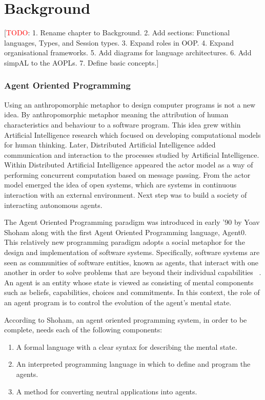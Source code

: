\documentclass[a4paper,12pt,oneside,fleqn]{book} %
\newcommand{\todo}[1]{[\textcolor{red}{TODO}: #1]}
\begin{document}

\part{Background}\label{ch:aop} %
\todo{1. Rename chapter to Background. 2. Add sections: Functional languages,
Types, and Session types. 3. Expand roles in OOP. 4. Expand organisational
frameworks. 5. Add diagrams for
language architectures. 6. Add simpAL to the AOPLs. 7. Define basic
concepts.}
\section{Agent Oriented Programming} %

Using an anthropomorphic metaphor to design computer programs is not a new
idea. By anthropomorphic metaphor meaning the attribution of human
characteristics and behaviour to a software program. This idea grew within
Artificial Intelligence research which focused on developing computational
models for human thinking. Later, Distributed Artificial Intelligence added
communication and interaction to the processes studied by Artificial
Intelligence.  Within Distributed Artificial Intelligence appeared the
actor model as a way of performing concurrent computation based on message
passing. From the actor model emerged the idea of open systems, which are
systems in continuous interaction with an external environment. Next step
was to build a society of interacting autonomous agents.

The Agent Oriented Programming paradigm was introduced in early '90 by Yoav
Shoham along with the first Agent Oriented Programming language, Agent0.
This relatively new programming paradigm adopts a social metaphor for the
design and implementation of software systems. Specifically, software
systems are seen as communities of software entities, known as agents, that
interact with one another in order to solve problems that are beyond their
individual capabilities ~\cite{DBLP:journals/ai/Shoham93}. An agent
is an entity whose state is viewed as consisting of mental components such
as beliefs, capabilities, choices and commitments. In this context, the role
of an agent program is to control the evolution of the agent's mental
state.

According to Shoham, an agent oriented programming system, in order to be
complete, needs each of the following components:
\begin{enumerate}
   \item A formal language with a clear syntax for describing the mental state.
   \item An interpreted programming language in which to define and program the agents.
   \item A method for converting neutral applications into agents.
\end{enumerate}
\end{document}
